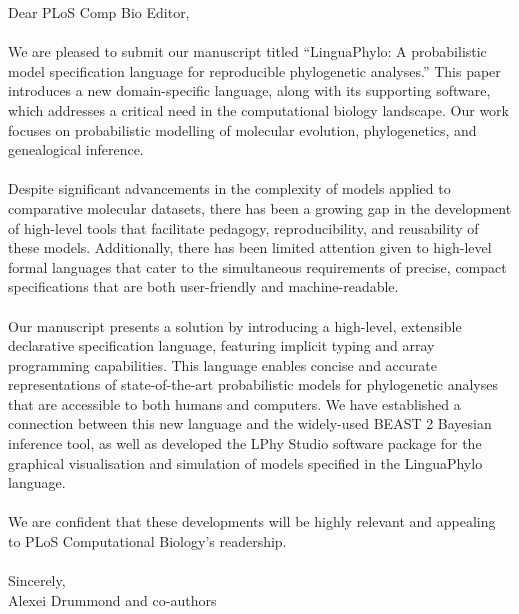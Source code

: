 \documentclass{article}
\begin{document}
\noindent Dear PLoS Comp Bio Editor,
\\\\
We are pleased to submit our manuscript titled ``LinguaPhylo: A probabilistic model specification language for reproducible phylogenetic analyses.'' This paper introduces a new domain-specific language, along with its supporting software, which addresses a critical need in the computational biology landscape. Our work focuses on probabilistic modelling of molecular evolution, phylogenetics, and genealogical inference.
\\\\
\noindent Despite significant advancements in the complexity of models applied to comparative molecular datasets, there has been a growing gap in the development of high-level tools that facilitate pedagogy, reproducibility, and reusability of these models. Additionally, there has been limited attention given to high-level formal languages that cater to the simultaneous requirements of precise, compact specifications that are both user-friendly and machine-readable.
\\\\
\noindent Our manuscript presents a solution by introducing a high-level, extensible declarative specification language, featuring implicit typing and array programming capabilities. This language enables concise and accurate representations of state-of-the-art probabilistic models for phylogenetic analyses that are accessible to both humans and computers. We have established a connection between this new language and the widely-used BEAST 2 Bayesian inference tool, as well as developed the LPhy Studio software package for the graphical visualisation and simulation of models specified in the LinguaPhylo language.
\\\\
\noindent We are confident that these developments will be highly relevant and appealing to PLoS Computational Biology's readership.
\\\\
\noindent Sincerely,\\
Alexei Drummond and co-authors
\end{document}
